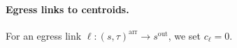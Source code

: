 \paragraph{Egress links to centroids.}
For an egress link $\ell:(s,\tau)^{\mathrm{arr}}\rightarrow s^{\mathrm{out}}$, we set $c_\ell=0$.

